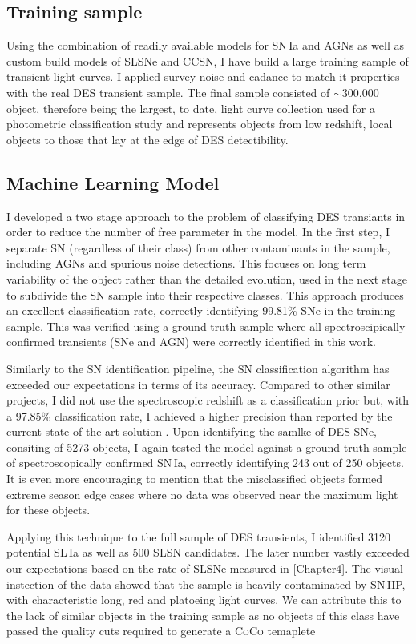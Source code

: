 \subsection{Training sample}
Using the combination of readily available models for SN\,Ia and AGNs as well as custom build models of SLSNe and CCSN, I have build a large training sample of transient light curves. I applied survey noise and cadance to match it properties with the real DES transient sample. The final sample consisted of $\sim$300,000 object, therefore being the largest, to date, light curve collection used for a photometric classification study and represents objects from low redshift, local objects to those that lay at the edge of DES detectibility.

\subsection{Machine Learning Model}
I developed a two stage approach to the problem of classifying DES transiants in order to reduce the number of free parameter in the model. In the first step, I separate SN (regardless of their class) from other contaminants in the sample, including AGNs and spurious noise detections. This focuses on long term variability of the object rather than the detailed evolution, used in the next stage to subdivide the SN sample
into their respective classes. This approach produces an excellent classification rate, correctly identifying 99.81\% SNe in the training sample. This was verified using a ground-truth sample where all spectroscipically confirmed transients (SNe and AGN) were correctly identified in this work.

Similarly to the SN identification pipeline, the SN classification algorithm has exceeded our expectations in terms of its accuracy. Compared to other similar projects, I did not use the spectroscopic redshift as a classification prior but, with a 97.85\% classification rate, I achieved a higher precision than reported by the current state-of-the-art solution \citep{Lochner2016}. Upon identifying the samlke of DES SNe, consiting of 5273 objects, I again tested the model against a ground-truth sample of spectroscopically confirmed SN\,Ia, correctly identifying 243 out of 250 objects. It is even more encouraging to mention that the misclassified objects formed extreme season edge cases where no data was observed near the maximum light for these objects.

Applying this technique to the full sample of DES transients, I identified 3120 potential SL\,Ia as well as 500 SLSN candidates. The later number vastly exceeded our expectations based on the rate of SLSNe measured in \cref{Chapter4}. The visual instection of the data showed that the sample is heavily contaminated by SN\,IIP, with characteristic long, red and platoeing light curves. We can attribute this to the lack of similar objects in the training sample as no objects of this class have passed the quality cuts required to generate a \textsc{CoCo} temaplete

